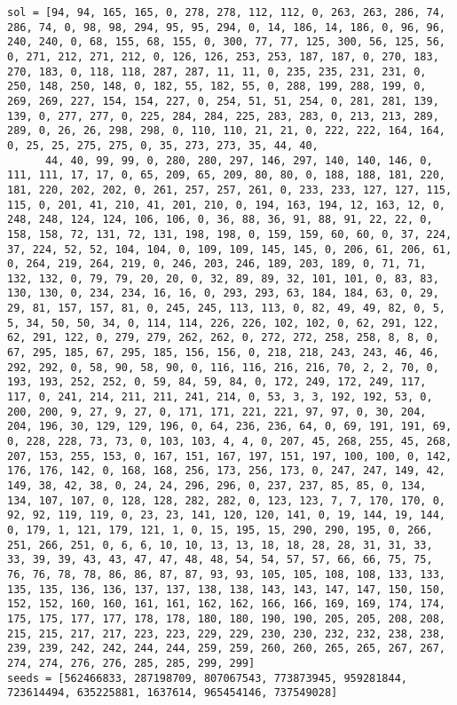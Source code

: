 \begin{lstlisting}[label={lst:call300vehicle90},caption=Optimal solution call\_300\_vehicle\_90]
sol = [94, 94, 165, 165, 0, 278, 278, 112, 112, 0, 263, 263, 286, 74, 286, 74, 0, 98, 98, 294, 95, 95, 294, 0, 14, 186, 14, 186, 0, 96, 96, 240, 240, 0, 68, 155, 68, 155, 0, 300, 77, 77, 125, 300, 56, 125, 56, 0, 271, 212, 271, 212, 0, 126, 126, 253, 253, 187, 187, 0, 270, 183, 270, 183, 0, 118, 118, 287, 287, 11, 11, 0, 235, 235, 231, 231, 0, 250, 148, 250, 148, 0, 182, 55, 182, 55, 0, 288, 199, 288, 199, 0, 269, 269, 227, 154, 154, 227, 0, 254, 51, 51, 254, 0, 281, 281, 139, 139, 0, 277, 277, 0, 225, 284, 284, 225, 283, 283, 0, 213, 213, 289, 289, 0, 26, 26, 298, 298, 0, 110, 110, 21, 21, 0, 222, 222, 164, 164, 0, 25, 25, 275, 275, 0, 35, 273, 273, 35, 44, 40,
      44, 40, 99, 99, 0, 280, 280, 297, 146, 297, 140, 140, 146, 0, 111, 111, 17, 17, 0, 65, 209, 65, 209, 80, 80, 0, 188, 188, 181, 220, 181, 220, 202, 202, 0, 261, 257, 257, 261, 0, 233, 233, 127, 127, 115, 115, 0, 201, 41, 210, 41, 201, 210, 0, 194, 163, 194, 12, 163, 12, 0, 248, 248, 124, 124, 106, 106, 0, 36, 88, 36, 91, 88, 91, 22, 22, 0, 158, 158, 72, 131, 72, 131, 198, 198, 0, 159, 159, 60, 60, 0, 37, 224, 37, 224, 52, 52, 104, 104, 0, 109, 109, 145, 145, 0, 206, 61, 206, 61, 0, 264, 219, 264, 219, 0, 246, 203, 246, 189, 203, 189, 0, 71, 71, 132, 132, 0, 79, 79, 20, 20, 0, 32, 89, 89, 32, 101, 101, 0, 83, 83, 130, 130, 0, 234, 234, 16, 16, 0, 293, 293, 63, 184, 184, 63, 0, 29, 29, 81, 157, 157, 81, 0, 245, 245, 113, 113, 0, 82, 49, 49, 82, 0, 5, 5, 34, 50, 50, 34, 0, 114, 114, 226, 226, 102, 102, 0, 62, 291, 122, 62, 291, 122, 0, 279, 279, 262, 262, 0, 272, 272, 258, 258, 8, 8, 0, 67, 295, 185, 67, 295, 185, 156, 156, 0, 218, 218, 243, 243, 46, 46, 292, 292, 0, 58, 90, 58, 90, 0, 116, 116, 216, 216, 70, 2, 2, 70, 0, 193, 193, 252, 252, 0, 59, 84, 59, 84, 0, 172, 249, 172, 249, 117, 117, 0, 241, 214, 211, 211, 241, 214, 0, 53, 3, 3, 192, 192, 53, 0, 200, 200, 9, 27, 9, 27, 0, 171, 171, 221, 221, 97, 97, 0, 30, 204, 204, 196, 30, 129, 129, 196, 0, 64, 236, 236, 64, 0, 69, 191, 191, 69, 0, 228, 228, 73, 73, 0, 103, 103, 4, 4, 0, 207, 45, 268, 255, 45, 268, 207, 153, 255, 153, 0, 167, 151, 167, 197, 151, 197, 100, 100, 0, 142, 176, 176, 142, 0, 168, 168, 256, 173, 256, 173, 0, 247, 247, 149, 42, 149, 38, 42, 38, 0, 24, 24, 296, 296, 0, 237, 237, 85, 85, 0, 134, 134, 107, 107, 0, 128, 128, 282, 282, 0, 123, 123, 7, 7, 170, 170, 0, 92, 92, 119, 119, 0, 23, 23, 141, 120, 120, 141, 0, 19, 144, 19, 144, 0, 179, 1, 121, 179, 121, 1, 0, 15, 195, 15, 290, 290, 195, 0, 266, 251, 266, 251, 0, 6, 6, 10, 10, 13, 13, 18, 18, 28, 28, 31, 31, 33, 33, 39, 39, 43, 43, 47, 47, 48, 48, 54, 54, 57, 57, 66, 66, 75, 75, 76, 76, 78, 78, 86, 86, 87, 87, 93, 93, 105, 105, 108, 108, 133, 133, 135, 135, 136, 136, 137, 137, 138, 138, 143, 143, 147, 147, 150, 150, 152, 152, 160, 160, 161, 161, 162, 162, 166, 166, 169, 169, 174, 174, 175, 175, 177, 177, 178, 178, 180, 180, 190, 190, 205, 205, 208, 208, 215, 215, 217, 217, 223, 223, 229, 229, 230, 230, 232, 232, 238, 238, 239, 239, 242, 242, 244, 244, 259, 259, 260, 260, 265, 265, 267, 267, 274, 274, 276, 276, 285, 285, 299, 299]
seeds = [562466833, 287198709, 807067543, 773873945, 959281844, 723614494, 635225881, 1637614, 965454146, 737549028]
\end{lstlisting}%
\clearpage


